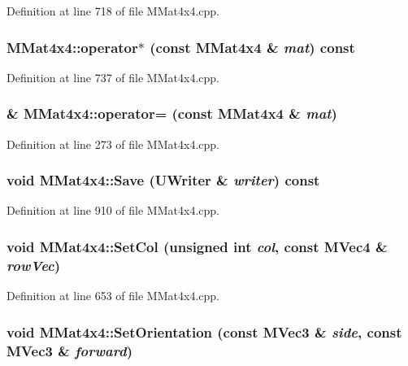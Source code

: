 Definition at line 718 of file MMat4x4.cpp.\hypertarget{class_m_mat4x4_4dc496e3911853ba028cf38e4be38e33}{
\subsubsection[{operator$\ast$}]{ MMat4x4::operator$\ast$ (const {\bf MMat4x4} \& {\em mat}) const}}
\label{class_m_mat4x4_4dc496e3911853ba028cf38e4be38e33}




Definition at line 737 of file MMat4x4.cpp.\hypertarget{class_m_mat4x4_498b45bc7d2108d20db5fe0f7b9f1890}{
\subsubsection[{operator=}]{ \& MMat4x4::operator= (const {\bf MMat4x4} \& {\em mat})}}
\label{class_m_mat4x4_498b45bc7d2108d20db5fe0f7b9f1890}




Definition at line 273 of file MMat4x4.cpp.\hypertarget{class_m_mat4x4_51096a071af230f20fe4d5a94db23913}{
\subsubsection[{Save}]{\setlength{\rightskip}{0pt plus 5cm}void MMat4x4::Save ({\bf UWriter} \& {\em writer}) const}}
\label{class_m_mat4x4_51096a071af230f20fe4d5a94db23913}




Definition at line 910 of file MMat4x4.cpp.\hypertarget{class_m_mat4x4_5b94c2756a481355e14a6e040f0a7025}{
\subsubsection[{SetCol}]{\setlength{\rightskip}{0pt plus 5cm}void MMat4x4::SetCol (unsigned int {\em col}, \/  const {\bf MVec4} \& {\em rowVec})}}
\label{class_m_mat4x4_5b94c2756a481355e14a6e040f0a7025}




Definition at line 653 of file MMat4x4.cpp.\hypertarget{class_m_mat4x4_95954820693d983fc18428eb935e1b01}{
\subsubsection[{SetOrientation}]{\setlength{\rightskip}{0pt plus 5cm}void MMat4x4::SetOrientation (const {\bf MVec3} \& {\em side}, \/  const {\bf MVec3} \& {\em forward})}}
\label{class_m_mat4x4_95954820693d983fc18428eb935e1b01}




